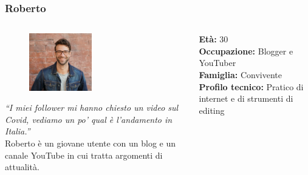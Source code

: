 \documentclass[handout]{beamer}
\begin{document}
		\begin{frame}
			\frametitle{Roberto}
			\begin{columns}[t]
				\begin{column}[T]{5cm}
					\begin{figure}
						\centering
						\vspace{-10pt}
						\includegraphics[height=2.5cm]{img/francesco}
					\end{figure}
					\vspace{-10pt}

					\textit{``I miei follower mi hanno chiesto un video sul Covid, vediamo un po' qual è l'andamento in Italia.''}\\
					Roberto è un giovane utente con un blog e un canale YouTube in cui tratta argomenti di attualità.
				\end{column}
				\begin{column}[T]{5cm}
					\textbf{Età:} 30\\
					\textbf{Occupazione:} Blogger e YouTuber\\
					\textbf{Famiglia:} Convivente\\
					\textbf{Profilo tecnico:} Pratico di internet e di strumenti di editing\\
				\end{column}
			\end{columns}
		\end{frame}
\end{document}
